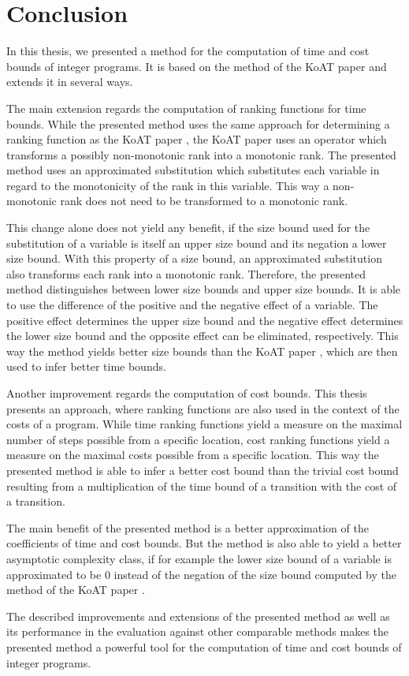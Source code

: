 \section{Conclusion}

In this thesis, we presented a method for the computation of time and cost bounds of integer programs.
It is based on the method of the KoAT paper \cite{koat} and extends it in several ways.

The main extension regards the computation of ranking functions for time bounds.
While the presented method uses the same approach for determining a ranking function as the KoAT paper \cite{koat}, the KoAT paper uses an operator which transforms a possibly non-monotonic rank into a monotonic rank.
The presented method uses an approximated substitution which substitutes each variable in regard to the monotonicity of the rank in this variable.
This way a non-monotonic rank does not need to be transformed to a monotonic rank.

This change alone does not yield any benefit, if the size bound used for the substitution of a variable is itself an upper size bound and its negation a lower size bound.
With this property of a size bound, an approximated substitution also transforms each rank into a monotonic rank.
Therefore, the presented method distinguishes between lower size bounds and upper size bounds.
It is able to use the difference of the positive and the negative effect of a variable.
The positive effect determines the upper size bound and the negative effect determines the lower size bound and the opposite effect can be eliminated, respectively.
This way the method yields better size bounds than the KoAT paper \cite{koat}, which are then used to infer better time bounds.

Another improvement regards the computation of cost bounds.
This thesis presents an approach, where ranking functions are also used in the context of the costs of a program.
While time ranking functions yield a measure on the maximal number of steps possible from a specific location, cost ranking functions yield a measure on the maximal costs possible from a specific location.
This way the presented method is able to infer a better cost bound than the trivial cost bound resulting from a multiplication of the time bound of a transition with the cost of a transition.

The main benefit of the presented method is a better approximation of the coefficients of time and cost bounds.
But the method is also able to yield a better asymptotic complexity class, if for example the lower size bound of a variable is approximated to be $0$ instead of the negation of the size bound computed by the method of the KoAT paper \cite{koat}.

The described improvements and extensions of the presented method as well as its performance in the evaluation against other comparable methods makes the presented method a powerful tool for the computation of time and cost bounds of integer programs.
